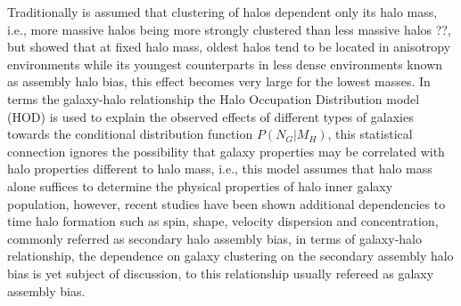 \documentclass[a4paper,fleqn,usenatbib]{mnras}
\begin{document}
Traditionally is assumed that clustering of halos dependent only its
halo mass, i.e., more massive halos being more strongly clustered than
less massive halos \citep{1984ApJ...284L...9K}??, but
\citet{2005MNRAS.363L..66G} showed that at fixed halo mass, oldest
halos tend to be located in anisotropy environments while its youngest
counterparts in less dense environments known as assembly halo bias,
this effect becomes very large for the lowest masses.  
In terms the galaxy-halo relationship the Halo Occupation Distribution
model (HOD) is used to explain the observed effects of different types
of galaxies towards the conditional distribution function
$P(N_G|M_H)$, this statistical connection ignores the possibility that
galaxy properties may be correlated with halo properties different to
halo mass, i.e., this model assumes that halo mass alone suffices to
determine the physical properties of halo inner galaxy population,
however, recent studies have been shown additional dependencies to
time halo formation such as spin, shape, velocity dispersion and
concentration, commonly referred as secondary halo assembly bias, in
terms of galaxy-halo relationship, the dependence on galaxy clustering
on the secondary assembly halo bias is yet subject of discussion, to
this relationship usually refereed as galaxy assembly bias. 
\end{document}
